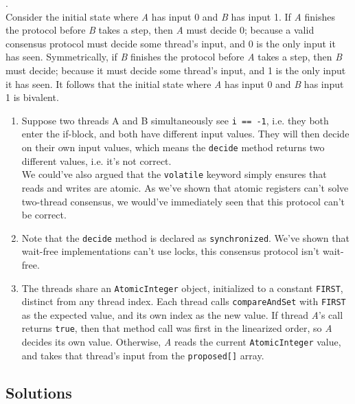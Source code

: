 \documentclass[main]{subfiles}
\begin{document}
\begin{ExerciseList}
        \Answer[ref={Cons}]. \\
            \Question Consider the initial state where \textit{A} has input 0 and \textit{B} has input 1. If \textit{A} finishes the protocol before \textit{B} takes a step, then \textit{A} must decide 0; because a valid consensus protocol must decide some thread's input, and 0 is the only input it has seen. Symmetrically, if \textit{B} finishes the protocol before \textit{A} takes a step, then \textit{B} must decide; because it must decide some thread's input, and 1 is the only input it has seen. It follows that the initial state where \textit{A} has input 0 and \textit{B} has input 1 is bivalent.
            \Question
                \begin{enumerate}[label=(\roman*)]
                    \item Suppose two threads A and B simultaneously see \texttt{i == -1}, i.e. they both enter the if-block, and both have different input values. They will then decide on their own input values, which means the \texttt{decide} method returns two different values, i.e. it's not correct. \\[3mm]
                    We could've also argued that the \texttt{volatile} keyword simply ensures that reads and writes are atomic. As we've shown that atomic registers can't solve two-thread consensus, we would've immediately seen that this protocol can't be correct.
                    \item Note that the \texttt{decide} method is declared as \texttt{synchronized}. We've shown that wait-free implementations can't use locks, this consensus protocol isn't wait-free.
                    \item The threads share an \texttt{AtomicInteger} object, initialized to a constant \texttt{FIRST}, distinct from any thread index. Each thread calls \texttt{compareAndSet} with \texttt{FIRST} as the expected value, and its own index as the new value. If thread \textit{A}'s call returns \texttt{true}, then that method call was first in the linearized order, so \textit{A} decides its own value. Otherwise, \textit{A} reads the current \texttt{AtomicInteger} value, and takes that thread's input from the \texttt{proposed[]} array.
                \end{enumerate}
    \end{ExerciseList}
\pagebreak
\subsection{Solutions}
\shipoutAnswer
\end{document}

